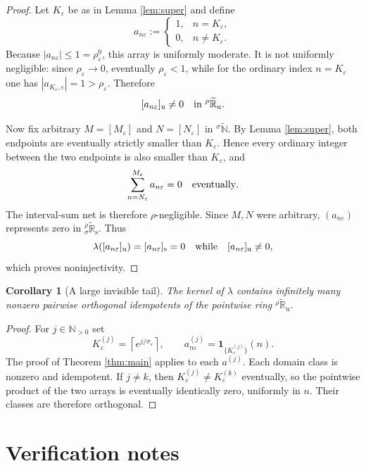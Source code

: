 \documentclass[11pt]{article}
\newtheorem{corollary}{Corollary}
\newcommand{\N}{\mathbb N}
\newcommand{\R}{\mathbb R}
\newcommand{\eps}{\varepsilon}
\newcommand{\Ru}{{}^{\rho}\widetilde{\R}_{\mathrm u}}
\newcommand{\Rs}{{}^{\rho}_{\sigma}\widetilde{\R}_{\mathrm s}}
\newcommand{\Ns}{{}^{\sigma}\widetilde{\N}}
\begin{document}
\begin{proof}
Let $K_\eps$ be as in Lemma \ref{lem:super} and define
\[
 a_{n\eps}:=
 \begin{cases}
  1,&n=K_\eps,\\
  0,&n\neq K_\eps.
 \end{cases}
\]
Because $|a_{n\eps}|\leq1=\rho_\eps^0$, this array is uniformly moderate.
It is not uniformly negligible: since $\rho_\eps\to0$, eventually
$\rho_\eps<1$, while for the ordinary index $n=K_\eps$ one has
$|a_{K_\eps,\eps}|=1>\rho_\eps$.  Therefore
\[
                         [a_{n\eps}]_{\mathrm u}\neq0
                         \quad\hbox{in }\Ru.
\]

Now fix arbitrary $M=[M_\eps]$ and $N=[N_\eps]$ in $\Ns$.  By Lemma
\ref{lem:super}, both endpoints are eventually strictly smaller than
$K_\eps$.  Hence every ordinary integer between the two endpoints is also
smaller than $K_\eps$, and
\[
                         \sum_{n=N_\eps}^{M_\eps}a_{n\eps}=0
                         \quad\hbox{eventually}.
\]
The interval-sum net is therefore $\rho$-negligible.  Since $M,N$ were
arbitrary, $(a_{n\eps})$ represents zero in $\Rs$.  Thus
\[
       \lambda([a_{n\eps}]_{\mathrm u})=[a_{n\eps}]_{\mathrm s}=0
       \quad\hbox{while}\quad [a_{n\eps}]_{\mathrm u}\neq0,
\]
which proves noninjectivity.
\end{proof}

\begin{corollary}[A large invisible tail]
The kernel of $\lambda$ contains infinitely many nonzero pairwise orthogonal
idempotents of the pointwise ring $\Ru$.
\end{corollary}

\begin{proof}
For $j\in\N_{>0}$ set
\[
 K^{(j)}_\eps=\left\lceil e^{j/\sigma_\eps}\right\rceil,
 \qquad
 a^{(j)}_{n\eps}=\mathbf 1_{\{K^{(j)}_\eps\}}(n).
\]
The proof of Theorem \ref{thm:main} applies to each $a^{(j)}$.  Each domain
class is nonzero and idempotent.  If $j\neq k$, then
$K^{(j)}_\eps\neq K^{(k)}_\eps$ eventually, so the pointwise product of the
two arrays is eventually identically zero, uniformly in $n$.  Their classes
are therefore orthogonal.
\end{proof}

\section{Verification notes}
\end{document}
